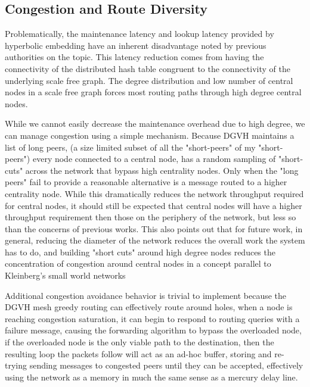 \subsection{Congestion and Route Diversity}
Problematically, the maintenance latency and lookup latency provided by hyperbolic embedding have an inherent disadvantage noted by previous authorities on the topic\cite{kleinberg2007geographic}. 
This latency reduction comes from having the connectivity of the distributed hash table congruent to the connectivity of the underlying scale free graph.
The degree distribution and low number of central nodes in a scale free graph forces most routing paths through high degree central nodes.

While we cannot easily decrease the maintenance overhead due to high degree, we can manage congestion using a simple mechanism.
Because DGVH maintains a list of long peers, (a size limited subset of all the "short-peers" of my "short-peers") every node connected to a central node, has a random sampling of "short-cuts" across the network that bypass high centrality nodes.
Only when the "long peers" fail to provide a reasonable alternative is a message routed to a higher centrality node.
While this dramatically reduces the network throughput required for central nodes, it should still be expected that central nodes will have a higher throughput requirement then those on the periphery of the network, but less so than the concerns of previous works\cite{kleinberg2007geographic}.
This also points out that for future work, in general, reducing the diameter of the network reduces the overall work the system has to do, and building "short cuts" around high degree nodes reduces the concentration of congestion around central nodes in a concept parallel to Kleinberg's small world networks\cite{kleinberg2000navigation}

Additional congestion avoidance behavior is trivial to implement because the DGVH mesh greedy routing can effectively route around holes, when a node is reaching congestion saturation, it can begin to respond to routing queries with a failure message, causing the forwarding algorithm to bypass the overloaded node, if the overloaded node is the only viable path to the destination, then the resulting loop the packets follow will act as an ad-hoc buffer, storing and re-trying sending messages to congested peers until they can be accepted, effectively using the network as a memory in much the same sense as a mercury delay line\cite{auerbach1949mercury}.

